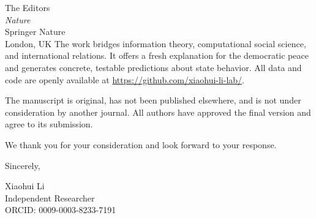 \documentclass[11pt]{letter}
\begin{document}
\begin{letter}{
    The Editors\\
    \textit{Nature}\\
    Springer Nature\\
    London, UK
}
The work bridges information theory, computational social science, and international relations. It offers a fresh explanation for the democratic peace and generates concrete, testable predictions about state behavior. All data and code are openly available at \url{https://github.com/xiaohui-li-lab/}.

The manuscript is original, has not been published elsewhere, and is not under consideration by another journal. All authors have approved the final version and agree to its submission.

We thank you for your consideration and look forward to your response.

\closing{Sincerely,}

\vspace{1cm}
Xiaohui Li\\
Independent Researcher\\
ORCID: 0009-0003-8233-7191

\end{letter}
\end{document}

